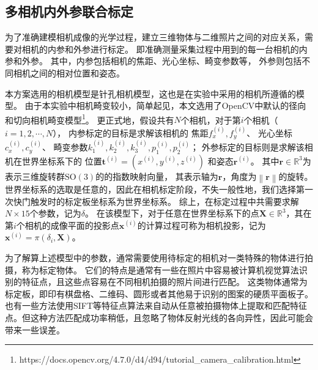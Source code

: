 \subsection{多相机内外参联合标定}
\label{sec:camera_calib}

为了准确建模相机成像的光学过程，建立三维物体与二维照片之间的对应关系，需要对相机的内参和外参进行标定。
即准确测量采集过程中用到的每一台相机的内参和外参。
其中，内参包括相机的焦距、光心坐标、畸变参数等，
外参则包括不同相机之间的相对位置和姿态。

本方案选用的相机模型是针孔相机模型，这也是在实验中采用的相机所遵循的模型。
由于本实验中相机畸变较小，简单起见，本文选用了OpenCV中默认的径向和切向相机畸变模型\footnote{https://docs.opencv.org/4.7.0/d4/d94/tutorial\_camera\_calibration.html}。
更正式地，假设共有$N$个相机，对于第$i$个相机（$i=1,2,\cdots,N$），
内参标定的目标是求解该相机的
焦距$f_x^{(i)},f_y^{(i)}$、
光心坐标$c_x^{(i)},c_y^{(i)}$、
畸变参数$k_1^{(i)},k_2^{(i)},k_3^{(i)},p_1^{(i)},p_2^{(i)}$；
外参标定的目标则是求解该相机在世界坐标系下的
位置$\mathbf{t}^{(i)}=\left(x^{(i)},y^{(i)},z^{(i)}\right)$
和姿态$\mathbf{r}^{(i)}$。
其中$\mathbf{r}\in \mathbb{R}^3$为表示三维旋转群$\mathrm{SO(3)}$的的指数映射向量，
其表示轴为$\mathbf{r}$，角度为$\left\| \mathbf{r}\right\|$的旋转。
世界坐标系的选取是任意的，因此在相机标定阶段，不失一般性地，我们选择第一次快门触发时的标定板坐标系为世界坐标系。
\def\camparam{\delta}
综上，在标定过程中共需要求解$N\times 15$个参数，记为$\camparam$。
在该模型下，对于任意在世界坐标系下的点$\mathbf{X}\in \mathbb{R}^3$，其在第$i$个相机的成像平面的投影点$\mathbf{x}^{(i)}$的计算过程可称为相机投影，记为$\mathbf{x}^{(i)}=\pi(\camparam_i, \mathbf{X})$。

为了解算上述模型中的参数，通常需要使用待标定的相机对一类特殊的物体进行拍摄，称为标定物体。
它们的特点是通常有一些在照片中容易被计算机视觉算法识别的特征点，且这些点容易在不同相机拍摄的照片间进行匹配。
这类物体通常为标定板，即印有棋盘格、二维码、圆形或者其他易于识别的图案的硬质平面板子。
也有一些方法\cite{colmap}使用SIFT等特征点算法来自动从任意被拍摄物体上提取和匹配特征点。但这种方法匹配成功率稍低，且忽略了物体反射光线的各向异性，因此可能会带来一些误差。

